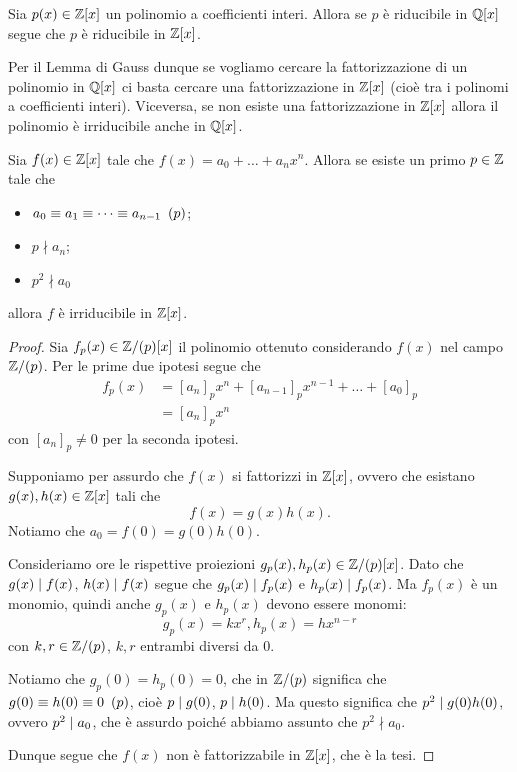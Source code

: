 \begin{theorem}
     \label{lemma_di_Gauss}
    Sia $p(x) \in \mathbb{Z}[x]$ un polinomio a coefficienti interi. Allora se $p$ è riducibile in $\mathbb{Q}[x]$ segue che $p$ è riducibile in $\mathbb{Z}[x]$.
\end{theorem}

Per il Lemma di Gauss dunque se vogliamo cercare la fattorizzazione di un polinomio in $\mathbb{Q}[x]$ ci basta cercare una fattorizzazione in $\mathbb{Z}[x]$ (cioè tra i polinomi a coefficienti interi). Viceversa, se non esiste una fattorizzazione in $\mathbb{Z}[x]$ allora il polinomio è irriducibile anche in $\mathbb{Q}[x]$.

\begin{proposition}
     \label{criterio_eisenstein}
    Sia $f(x) \in \mathbb{Z}[x]$ tale che $f(x) = a_0 + \dots + a_nx^n$. Allora se esiste un primo $p \in \mathbb{Z}$ tale che \begin{itemize}
        \item $a_0 \equiv a_1 \equiv \dots \equiv a_{n-1} \ \left(p\right)$;
        \item $p \nmid a_n$;
        \item $p^2 \nmid a_0$
    \end{itemize}
    allora $f$ è irriducibile in $\mathbb{Z}[x]$.
\end{proposition}
\begin{proof}
    Sia $f_p(x) \in \mathbb{Z}/(p)[x]$ il polinomio ottenuto considerando $f(x)$ nel campo $\mathbb{Z}/(p)$. Per le prime due ipotesi segue che \begin{align*}
        f_p(x) &= [a_n]_px^n + [a_{n-1}]_px^{n-1} + \dots + [a_0]_p \\
        &= [a_n]_px^n
    \end{align*} con $[a_n]_p \neq 0$ per la seconda ipotesi.

    Supponiamo per assurdo che $f(x)$ si fattorizzi in $\mathbb{Z}[x]$, ovvero che esistano $g(x), h(x) \in \mathbb{Z}[x]$ tali che \[
        f(x) = g(x)h(x).
    \] Notiamo che $a_0 = f(0) = g(0)h(0)$. 
    
    Consideriamo ore le rispettive proiezioni $g_p(x), h_p(x) \in \mathbb{Z}/(p)[x]$. Dato che $g(x) \mid f(x)$, $h(x) \mid f(x)$ segue che $g_p(x) \mid f_p(x)$ e $h_p(x) \mid f_p(x)$. Ma $f_p(x)$ è un monomio, quindi anche $g_p(x)$ e $h_p(x)$ devono essere monomi:
    \[
        g_p(x) = kx^r, h_p(x) = hx^{n-r}    
    \] con $k, r \in \mathbb{Z}/(p)$, $k, r$ entrambi diversi da $0$.

    Notiamo che $g_p(0) = h_p(0) = 0$, che in $\mathbb{Z}/(p)$ significa che $g(0) \equiv h(0) \equiv 0 \ \left(p\right)$, cioè $p \mid g(0)$, $p \mid h(0)$. Ma questo significa che $p^2 \mid g(0)h(0)$, ovvero $p^2 \mid a_0$, che è assurdo poiché abbiamo assunto che $p^2 \nmid a_0$.

    Dunque segue che $f(x)$ non è fattorizzabile in $\mathbb{Z}[x]$, che è la tesi.
\end{proof}

